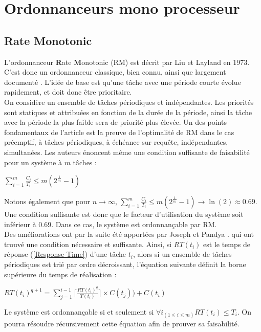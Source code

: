 \documentclass[11pt,a4paper,oneside]{report}
\begin{document}
\section{Ordonnanceurs mono processeur}

\subsection{Rate Monotonic}
L'ordonnanceur \textbf{R}ate \textbf{M}onotonic (RM) est décrit par Liu et Layland \cite{liu_scheduling_1973} en 1973. C'est 
donc un ordonnanceur classique, bien connu, ainsi que largement documenté \cite{kermia_ordonnancement_2009}. 
L'idée de base est qu'une tâche avec une période courte évolue rapidement, et 
doit donc être prioritaire.\\
On considère un ensemble de tâches périodiques et indépendantes.
Les priorités sont statiques et attribuées en fonction de la durée de la période, ainsi 
la tâche avec la période la plus faible sera de priorité plus élevée. 
Un des points fondamentaux de l'article est la preuve de l'optimalité de RM dans le cas 
préemptif, à tâches périodiques, à échéance sur requête, indépendantes, simultanées.
Les auteurs énoncent même une condition suffisante de faisabilité pour un système à $m$ tâches : \\
\begin{center}
	$\sum_{i=1}^{m}\frac{C_i}{T_i} \leq m(2^{\frac{1}{m}}-1)$
\end{center}
Notons également que pour $n \rightarrow \infty$, $\sum_{i=1}^{m}\frac{C_i}{T_i} \leq m(2^{\frac{1}{m}}-1) \rightarrow \ln(2) \approx 0.69$.
Une condition suffisante est donc que le facteur d'utilisation du système soit inférieur à 0.69. 
Dans ce cas, le système est ordonnançable par RM.\\

Des améliorations ont par la suite été apportées par Joseph et Pandya \cite{joseph_finding_1986}.
qui ont trouvé une condition nécessaire et suffisante. 
Ainsi, si $RT(t_i)$ est le temps de réponse (\ref{Response Time}) d'une tâche $t_i$, 
alors si un ensemble de tâches périodiques est trié par ordre décroissant, l'équation suivante 
définit la borne supérieure du temps de réalisation :
\begin{center}
	$RT(t_i)^{q+1} = \sum_{j=1}^{i-1} \lceil \frac{RT(t_i)^q}{T(t_i)} \rceil \times C(t_j)) + C(t_i)$
\end{center}
Le système est ordonnançable si et seulement si $\forall i_{(1 \leq i \leq m)}RT(t_i) \leq T_i$.
On pourra résoudre récursivement cette équation afin de prouver sa faisabilité.\\
\end{document}
